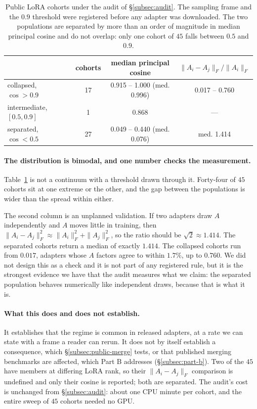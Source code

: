 \begin{table}[tb]
\centering
\small
\caption{Public LoRA cohorts under the audit of \S\ref{subsec:audit}. The
sampling frame and the $0.9$ threshold were registered before any adapter was
downloaded. The two populations are separated by more than an order of
magnitude in median principal cosine and do not overlap: only one cohort of
$45$ falls between $0.5$ and $0.9$.}
\label{tab:prevalence}
\begin{tabular}{lccc}
\toprule
 & cohorts & median principal cosine & $\|A_i - A_j\|_F/\|A_i\|_F$ \\
\midrule
collapsed, $\cos > 0.9$      & 17 & 0.915 -- 1.000 (med. 0.996) & 0.017 -- 0.760 \\
intermediate, $[0.5, 0.9]$   & 1  & 0.868 & --- \\
separated, $\cos < 0.5$      & 27 & 0.049 -- 0.440 (med. 0.076) & med. 1.414 \\
\bottomrule
\end{tabular}
\end{table}

\paragraph{The distribution is bimodal, and one number checks the
measurement.} Table~\ref{tab:prevalence} is not a continuum with a threshold
drawn through it. Forty-four of $45$ cohorts sit at one extreme or the other,
and the gap between the populations is wider than the spread within either.

The second column is an unplanned validation. If two adapters draw $A$
independently and $A$ moves little in training, then
$\|A_i - A_j\|_F^2 \approx \|A_i\|_F^2 + \|A_j\|_F^2$, so the ratio should be
$\sqrt 2 \approx 1.414$. The separated cohorts return a median of exactly
$1.414$. The collapsed cohorts run from $0.017$, adapters whose $A$ factors
agree to within $1.7\%$, up to $0.760$. We did not design this as a check and
it is not part of any registered rule, but it is the strongest evidence we have
that the audit measures what we claim: the separated population behaves
numerically like independent draws, because that is what it is.

\paragraph{What this does and does not establish.} It establishes that the
regime is common in released adapters, at a rate we can state with a frame a
reader can rerun. It does not by itself establish a consequence, which
\S\ref{subsec:public-merge} tests, or that published merging benchmarks are
affected, which Part B addresses (\S\ref{subsec:part-b}). Two of the $45$ have
members at differing LoRA rank, so their
$\|A_i - A_j\|_F$ comparison is undefined and only their cosine is reported;
both are separated. The audit's cost is unchanged from
\S\ref{subsec:audit}: about one CPU minute per cohort, and the entire sweep of
$45$ cohorts needed no GPU.

